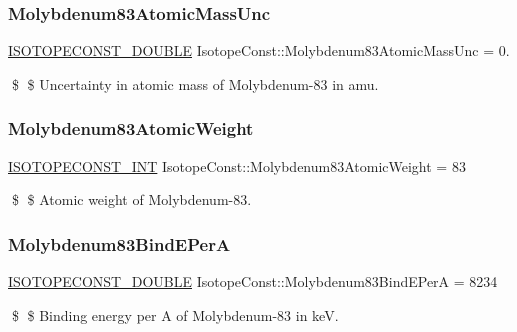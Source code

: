 \subsubsection{\texorpdfstring{Molybdenum83\+Atomic\+Mass\+Unc}{Molybdenum83AtomicMassUnc}}
{\footnotesize\ttfamily \mbox{\hyperlink{group___isotope_const-_macros_ga8f45a7272ce02c0b4c65c44636ed719a}{I\+S\+O\+T\+O\+P\+E\+C\+O\+N\+S\+T\+\_\+\+D\+O\+U\+B\+LE}} Isotope\+Const\+::\+Molybdenum83\+Atomic\+Mass\+Unc = 0.}

\$ \$ Uncertainty in atomic mass of Molybdenum-\/83 in amu. \mbox{\label{group___isotope_const-_molybdenum-_mo83_gab4d17f1dacecbd21ecbff940349cdb28}} 
\subsubsection{\texorpdfstring{Molybdenum83\+Atomic\+Weight}{Molybdenum83AtomicWeight}}
{\footnotesize\ttfamily \mbox{\hyperlink{group___isotope_const-_macros_ga5f18360b3e99483a35c32d789e62621c}{I\+S\+O\+T\+O\+P\+E\+C\+O\+N\+S\+T\+\_\+\+I\+NT}} Isotope\+Const\+::\+Molybdenum83\+Atomic\+Weight = 83}

\$ \$ Atomic weight of Molybdenum-\/83. \mbox{\label{group___isotope_const-_molybdenum-_mo83_ga510b6157b5704cbdf7ea6d1bc442a584}} 
\subsubsection{\texorpdfstring{Molybdenum83\+Bind\+E\+PerA}{Molybdenum83BindEPerA}}
{\footnotesize\ttfamily \mbox{\hyperlink{group___isotope_const-_macros_ga8f45a7272ce02c0b4c65c44636ed719a}{I\+S\+O\+T\+O\+P\+E\+C\+O\+N\+S\+T\+\_\+\+D\+O\+U\+B\+LE}} Isotope\+Const\+::\+Molybdenum83\+Bind\+E\+PerA = 8234}

\$ \$ Binding energy per A of Molybdenum-\/83 in keV. \mbox{\label{group___isotope_const-_molybdenum-_mo83_ga83376e97b56a902add449213feb16975}} 

